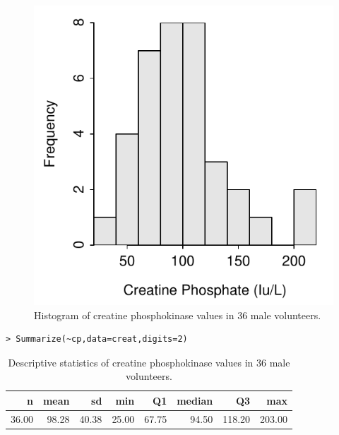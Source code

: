 \documentclass[10pt,openany]{book}\usepackage[]{graphicx}\usepackage[]{color}
\makeatletter
\newenvironment{kframe}{%
 \def\at@end@of@kframe{}%
 \ifinner\ifhmode%
  \def\at@end@of@kframe{\end{minipage}}%
  \begin{minipage}{\columnwidth}%
 \fi\fi%
 \def\FrameCommand##1{\hskip\@totalleftmargin \hskip-\fboxsep
 \colorbox{shadecolor}{##1}\hskip-\fboxsep
     \hskip-\linewidth \hskip-\@totalleftmargin \hskip\columnwidth}%
 \MakeFramed {\advance\hsize-\width
   \@totalleftmargin\z@ \linewidth\hsize
   \@setminipage}}%
 {\par\unskip\endMakeFramed%
 \at@end@of@kframe}
\newenvironment{knitrout}{}{} %
\makeatother
\begin{document}
\begin{itemize}
\begin{knitrout}
\begin{figure}[hbtp]
{\centering \includegraphics[width=.4\linewidth]{Figs/CPHist-1} 

}

\caption[Histogram of creatine phosphokinase values in 36 male volunteers]{Histogram of creatine phosphokinase values in 36 male volunteers.}\label{fig:CPHist}
\end{figure}


\end{knitrout}
\begin{knitrout}
\color{fgcolor}\begin{kframe}
\begin{verbatim}
> Summarize(~cp,data=creat,digits=2)
\end{verbatim}
\end{kframe}
\end{knitrout}
\begin{table}[ht]
\centering
\caption{Descriptive statistics of creatine phosphokinase values in 36 male volunteers.} 
\label{tab:CPSum}
\begin{tabular}{rrrrrrrr}
  \hline
n & mean & sd & min & Q1 & median & Q3 & max \\ 
  \hline
36.00 & 98.28 & 40.38 & 25.00 & 67.75 & 94.50 & 118.20 & 203.00 \\ 
   \hline
\end{tabular}
\end{table}





\end{itemize}
\end{document}
